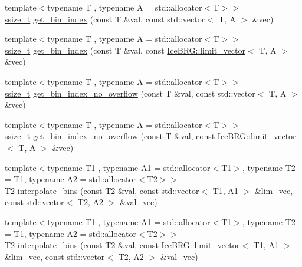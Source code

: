 \begin{DoxyCompactItemize}
\item 
{\footnotesize template$<$typename T , typename A  = std\-::allocator$<$\-T$>$$>$ }\\\hyperlink{lib_2IceBRG__main_2common_8h_ab322a3e50421dc5f0c43316b1b373592}{ssize\-\_\-t} \hyperlink{namespaceIceBRG_a0d177f40b329aa7a095bfc02051046aa}{get\-\_\-bin\-\_\-index} (const T \&val, const std\-::vector$<$ T, A $>$ \&vec)
\item 
{\footnotesize template$<$typename T , typename A  = std\-::allocator$<$\-T$>$$>$ }\\\hyperlink{lib_2IceBRG__main_2common_8h_ab322a3e50421dc5f0c43316b1b373592}{ssize\-\_\-t} \hyperlink{namespaceIceBRG_a6c955f3530858da3bcafaaa2cb21a456}{get\-\_\-bin\-\_\-index} (const T \&val, const \hyperlink{classIceBRG_1_1limit__vector}{Ice\-B\-R\-G\-::limit\-\_\-vector}$<$ T, A $>$ \&vec)
\item 
{\footnotesize template$<$typename T , typename A  = std\-::allocator$<$\-T$>$$>$ }\\\hyperlink{lib_2IceBRG__main_2common_8h_ab322a3e50421dc5f0c43316b1b373592}{ssize\-\_\-t} \hyperlink{namespaceIceBRG_a9a5e49d0ca7f9c3013fecfb5454ec557}{get\-\_\-bin\-\_\-index\-\_\-no\-\_\-overflow} (const T \&val, const std\-::vector$<$ T, A $>$ \&vec)
\item 
{\footnotesize template$<$typename T , typename A  = std\-::allocator$<$\-T$>$$>$ }\\\hyperlink{lib_2IceBRG__main_2common_8h_ab322a3e50421dc5f0c43316b1b373592}{ssize\-\_\-t} \hyperlink{namespaceIceBRG_a282fa57b97668087d0b492a65e2d268b}{get\-\_\-bin\-\_\-index\-\_\-no\-\_\-overflow} (const T \&val, const \hyperlink{classIceBRG_1_1limit__vector}{Ice\-B\-R\-G\-::limit\-\_\-vector}$<$ T, A $>$ \&vec)
\item 
{\footnotesize template$<$typename T1 , typename A1  = std\-::allocator$<$\-T1$>$, typename T2  = T1, typename A2  = std\-::allocator$<$\-T2$>$$>$ }\\T2 \hyperlink{namespaceIceBRG_ab951dba63c7caf7695832d4991da041f}{interpolate\-\_\-bins} (const T2 \&val, const std\-::vector$<$ T1, A1 $>$ \&lim\-\_\-vec, const std\-::vector$<$ T2, A2 $>$ \&val\-\_\-vec)
\item 
{\footnotesize template$<$typename T1 , typename A1  = std\-::allocator$<$\-T1$>$, typename T2  = T1, typename A2  = std\-::allocator$<$\-T2$>$$>$ }\\T2 \hyperlink{namespaceIceBRG_ab00a5bc9c31ab027035a0255ab9fa4b4}{interpolate\-\_\-bins} (const T2 \&val, const \hyperlink{classIceBRG_1_1limit__vector}{Ice\-B\-R\-G\-::limit\-\_\-vector}$<$ T1, A1 $>$ \&lim\-\_\-vec, const std\-::vector$<$ T2, A2 $>$ \&val\-\_\-vec)

\end{DoxyCompactItemize}
